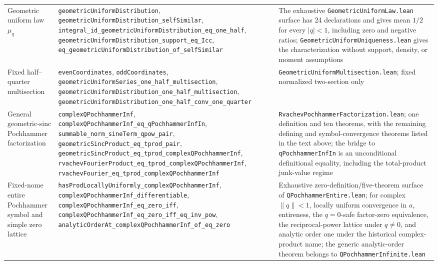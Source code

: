 \documentclass[11pt,oneside]{article}
\theoremstyle{definition}
\theoremstyle{remark}
\begin{document}
\begin{longtable}{@{}>{\raggedright\arraybackslash}p{} >{\raggedright\arraybackslash}p{} >{\raggedright\arraybackslash}p{}@{}}
Geometric uniform law \(\mu_q\) & \nolinkurl{geometricUniformDistribution}, \nolinkurl{geometricUniformDistribution_selfSimilar}, \nolinkurl{integral_id_geometricUniformDistribution_eq_one_half}, \nolinkurl{geometricUniformDistribution_support_eq_Icc}, \nolinkurl{eq_geometricUniformDistribution_of_selfSimilar} & The exhaustive \nolinkurl{GeometricUniformLaw.lean} surface has 24 declarations and gives mean \(1/2\) for every \(\lvert q\rvert<1\), including zero and negative ratios; \nolinkurl{GeometricUniformUniqueness.lean} gives the characterization without support, density, or moment assumptions \\
Fixed half--quarter multisection & \nolinkurl{evenCoordinates}, \nolinkurl{oddCoordinates}, \nolinkurl{geometricUniformSeries_one_half_multisection}, \nolinkurl{geometricUniformDistribution_one_half_multisection}, \nolinkurl{geometricUniformDistribution_one_half_conv_one_quarter} & \nolinkurl{GeometricUniformMultisection.lean}; fixed normalized two-section only \\
General geometric-sinc Pochhammer factorization & \nolinkurl{complexQPochhammerInf}, \nolinkurl{complexQPochhammerInf_eq_qPochhammerInfIn}, \nolinkurl{summable_norm_sineTerm_qpow_pair}, \nolinkurl{geometricSincProduct_eq_tprod_pair}, \nolinkurl{geometricSincProduct_eq_tprod_complexQPochhammerInf}, \nolinkurl{rvachevFourierProduct_eq_tprod_complexQPochhammerInf}, \nolinkurl{rvachevFourier_eq_tprod_complexQPochhammerInf} & \nolinkurl{RvachevPochhammerFactorization.lean}; one definition and ten theorems, with the remaining defining and symbol-convergence theorems listed in the text above; the bridge to \nolinkurl{qPochhammerInfIn} is an unconditional definitional equality, including the total-product junk-value regime \\
Fixed-nome entire Pochhammer symbol and simple zero lattice & \nolinkurl{hasProdLocallyUniformly_complexQPochhammerInf}, \nolinkurl{complexQPochhammerInf_differentiable}, \nolinkurl{complexQPochhammerInf_eq_zero_iff}, \nolinkurl{complexQPochhammerInf_eq_zero_iff_eq_inv_pow}, \nolinkurl{analyticOrderAt_complexQPochhammerInf_of_eq_zero} & Exhaustive zero-definition/five-theorem surface of \nolinkurl{QPochhammerEntire.lean}; for complex \(\lVert q\rVert<1\), locally uniform convergence in \(a\), entireness, the \(q=0\)-safe factor-zero equivalence, the reciprocal-power lattice under \(q\ne0\), and analytic order one under the historical complex-product name; the generic analytic-order theorem belongs to \nolinkurl{QPochhammerInfinite.lean} \\

\end{longtable}
\end{document}
